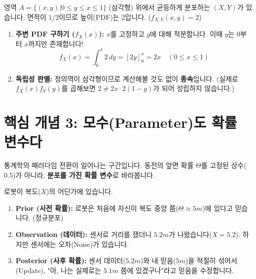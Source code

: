 \documentclass[11pt,a4paper]{book}
\theoremstyle{definition}
\begin{document}
\begin{examplebox}[title={삼각형 위에서의 균등 분포}]
영역 $A = \{(x,y) | 0 \le y \le x \le 1\}$ (삼각형) 위에서 균등하게 분포하는 $(X,Y)$가 있습니다. 면적이 $1/2$이므로 높이(PDF)는 2입니다. ($f_{X,Y}(x,y)=2$)
\begin{enumerate}
    \item \textbf{주변 PDF 구하기 ($f_X(x)$):}
    $x$를 고정하고 $y$에 대해 적분합니다. 이때 $y$는 $0$부터 $x$까지만 존재합니다!
    \[ f_X(x) = \int_{0}^{x} 2 \, dy = [2y]_0^x = 2x \quad (0 \le x \le 1) \]
    \item \textbf{독립성 판별:}
    정의역이 삼각형이므로 계산해볼 것도 없이 \textbf{종속}입니다. (실제로 $f_X(x)f_Y(y)$를 곱해보면 $2 \neq 2x \cdot 2(1-y)$가 되어 성립하지 않습니다.)
\end{enumerate}
\end{examplebox}

\section{핵심 개념 3: 모수(Parameter)도 확률 변수다}

통계학의 패러다임 전환이 일어나는 구간입니다. 동전의 앞면 확률 $\Theta$를 고정된 상수($0.5$)가 아니라, \textbf{분포를 가진 확률 변수}로 바라봅니다.

\begin{storybox}[title={로봇의 위치 추정 (Localization)}]
로봇이 복도($X$)의 어딘가에 있습니다.
\begin{enumerate}
    \item \textbf{Prior (사전 확률):} 로봇은 처음에 자신이 복도 중앙 쯤($\Theta \approx 5m$)에 있다고 믿습니다. (정규분포)
    \item \textbf{Observation (데이터):} 센서로 거리를 쟀더니 $5.2m$가 나왔습니다($X=5.2$). 하지만 센서에는 오차(Noise)가 있습니다.
    \item \textbf{Posterior (사후 확률):} 센서 데이터($5.2m$)와 내 믿음($5m$)을 적절히 섞어서(Update), "아, 나는 실제로는 $5.1m$ 쯤에 있겠구나"라고 믿음을 수정합니다.
\end{enumerate}
\end{storybox}
\end{document}
